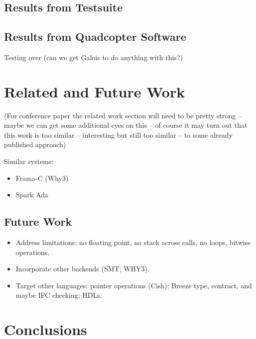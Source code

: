 \documentclass{article}
\begin{document}
\subsection{Results from Testsuite}
\subsection{Results from Quadcopter Software}
Testing over (can we get Galois to do anything with this?)

\section{Related and Future Work}
(For conference paper the related work section will need to be 
pretty strong -- maybe we can get some additional eyes on this -- 
of course it may turn out that this work is too similar -- interesting
but still too similar -- to some already published approach)

Similar systems:
\begin{itemize}
  \item Frama-C (Why3)
  \item Spark Ada
\end{itemize}

\subsection{Future Work}
\begin{itemize}
  \item Address limitations: no floating point, no stack across calls, no loops, bitwise operations.
  \item Incorporate other backends (SMT, WHY3).
  \item Target other languages: pointer operations (Cish); Breeze type, contract, and maybe IFC checking; HDLs.
\end{itemize}

\section{Conclusions}
\end{document}
